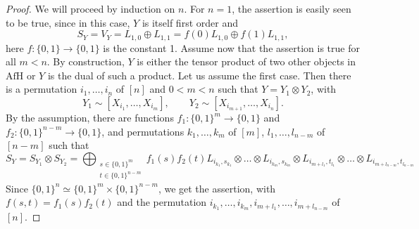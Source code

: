\documentclass[12pt]{article}
\theoremstyle{definition}
\theoremstyle{remark}
\def \Afh{\mathrm{AfH}}
\begin{document}
\begin{proof} We will proceed by induction on $n$. For $n=1$, the assertion is easily seen
to be true, since in this case, $Y$ is itself first order and
\[
S_Y=V_Y=L_{1,0}\oplus L_{1,1}=f(0)L_{1,0}\oplus f(1)L_{1,1},
\]
here $f:\{0,1\}\to \{0,1\}$ is the constant 1. Assume now that the assertion is true for
all $m<n$. By construction, $Y$ is either the tensor product of two other objects in
$\Afh$ or $Y$ is the dual of such a product. Let us assume the first case. Then there is a
permutation $i_1,\dots, i_n$ of $[n]$ and $0<m<n$  such that $Y=Y_1\otimes Y_2$, with
\[
Y_1\sim [X_{i_1},\dots, X_{i_m}],\qquad Y_2\sim[X_{i_{m+1}},\dots, X_{i_n}].
\]
  By the
assumption, there are functions $f_1:\{0,1\}^{m}\to \{0,1\}$ and $f_2:\{0,1\}^{n-m}\to
\{0,1\}$, and permutations $k_1,\dots, k_m$ of $[m]$, $l_1,\dots,l_{n-m}$ of $[n-m]$
such that
\[
S_Y=S_{Y_1}\otimes S_{Y_2}=\bigoplus_{\substack{s\in\{0,1\}^{m}\\ t\in
\{0,1\}^{n-m}}}
f_1(s)f_2(t)L_{i_{k_1},s_{k_1}}\otimes\dots \otimes L_{i_{k_m},s_{k_m}}\otimes
L_{i_{m+l_1},t_{l_1}}\otimes\dots\otimes L_{i_{m+l_{n-m}},t_{l_{n-m}}}
\]
Since $\{0,1\}^n\simeq \{0,1\}^m\times \{0,1\}^{n-m}$, we get the assertion, with
$f(s,t)=f_1(s)f_2(t)$ and the permutation
$i_{k_1},\dots,i_{k_m},i_{m+l_1},\dots,i_{m+l_{n-m}}$ of $[n]$.


\end{proof}
\end{document}
